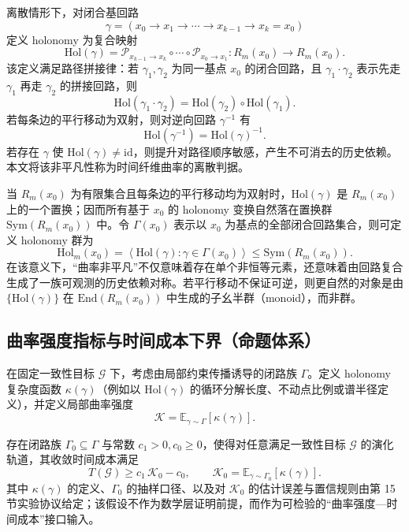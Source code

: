离散情形下，对闭合基回路
$$
\gamma=(x_0\to x_1\to\cdots\to x_{k-1}\to x_k=x_0)
$$
定义 holonomy 为复合映射
$$
\mathrm{Hol}(\gamma)=\mathcal P_{x_{k-1}\to x_k}\circ\cdots\circ \mathcal P_{x_0\to x_1}:R_m(x_0)\to R_m(x_0).
$$
该定义满足路径拼接律：若 $\gamma_1,\gamma_2$ 为同一基点 $x_0$ 的闭合回路，且 $\gamma_1\cdot\gamma_2$ 表示先走 $\gamma_1$ 再走 $\gamma_2$ 的拼接回路，则
$$
\mathrm{Hol}(\gamma_1\cdot\gamma_2)=\mathrm{Hol}(\gamma_2)\circ \mathrm{Hol}(\gamma_1).
$$
若每条边的平行移动为双射，则对逆向回路 $\gamma^{-1}$ 有
$$
\mathrm{Hol}(\gamma^{-1})=\mathrm{Hol}(\gamma)^{-1}.
$$
若存在 $\gamma$ 使 $\mathrm{Hol}(\gamma)\neq\mathrm{id}$，则提升对路径顺序敏感，产生不可消去的历史依赖。本文将该非平凡性称为时间纤维曲率的离散判据。

\begin{remark}\label{rem:holonomy-group}
当 $R_m(x_0)$ 为有限集合且每条边的平行移动均为双射时，$\mathrm{Hol}(\gamma)$ 是 $R_m(x_0)$ 上的一个置换；因而所有基于 $x_0$ 的 holonomy 变换自然落在置换群 $\mathrm{Sym}(R_m(x_0))$ 中。令 $\Gamma(x_0)$ 表示以 $x_0$ 为基点的全部闭合回路集合，则可定义 holonomy 群为
$$
\mathrm{Hol}_m(x_0)=\left\langle \mathrm{Hol}(\gamma):\gamma\in\Gamma(x_0)\right\rangle
\le \mathrm{Sym}(R_m(x_0)).
$$
在该意义下，“曲率非平凡”不仅意味着存在单个非恒等元素，还意味着由回路复合生成了一族可观测的历史依赖对称。若平行移动不保证可逆，则更自然的对象是由 $\{\mathrm{Hol}(\gamma)\}$ 在 $\mathrm{End}(R_m(x_0))$ 中生成的子幺半群（monoid），而非群。
\end{remark}

\subsection{曲率强度指标与时间成本下界（命题体系）}

在固定一致性目标 $\mathcal G$ 下，考虑由局部约束传播诱导的闭路族 $\Gamma$。定义 holonomy 复杂度函数 $\kappa(\gamma)$（例如以 $\mathrm{Hol}(\gamma)$ 的循环分解长度、不动点比例或谱半径定义），并定义局部曲率强度
$$
\mathcal K=\mathbb E_{\gamma\sim \Gamma}[\kappa(\gamma)].
$$

\begin{assumption}\label{ass:structural_lower_bound}
\InterfaceTag 存在闭路族 $\Gamma_0\subseteq\Gamma$ 与常数 $c_1>0,c_0\ge 0$，使得对任意满足一致性目标 $\mathcal G$ 的演化轨道，其收敛时间成本满足
$$
T(\mathcal G)\ge c_1\,\mathcal K_0-c_0,
\qquad
\mathcal K_0=\mathbb E_{\gamma\sim\Gamma_0}[\kappa(\gamma)].
$$
\AuditTag 其中 $\kappa(\gamma)$ 的定义、$\Gamma_0$ 的抽样口径、以及对 $\mathcal K_0$ 的估计误差与置信规则由第 15 节实验协议给定；该假设不作为数学层证明前提，而作为可检验的“曲率强度—时间成本”接口输入。
\end{assumption}

